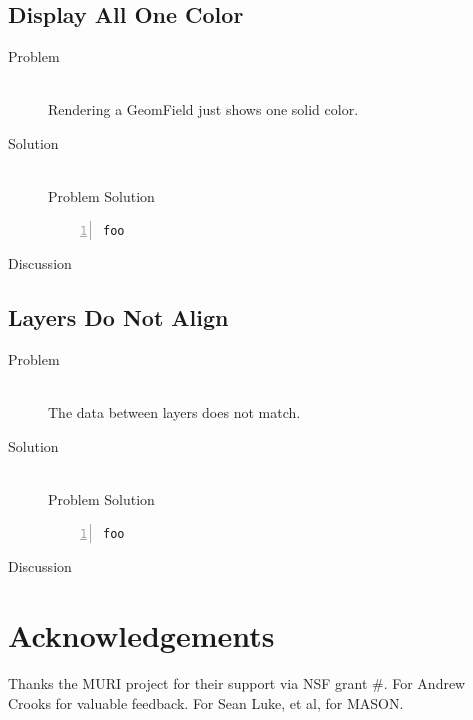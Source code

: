 \documentclass[twoside,10pt]{book}
\newcommand\code[1]{\textsf{#1}}
\begin{document}
\section{Display All One Color}
\label{sec:OneColorDisplay}

\begin{description}
\item[Problem]~\\
Rendering a \code{GeomField} just shows one solid color.

\item[Solution]~\\
Problem Solution
\begin{Verbatim}[frame=lines,framesep=5mm,numbers=left,commandchars=+\[\]]
foo
\end{Verbatim}

\item[Discussion ]
\end{description}


\section{Layers Do Not Align}
\label{sec:NonAlignedLayers}

\begin{description}
\item[Problem]~\\
The data between layers does not match.

\item[Solution]~\\
Problem Solution
\begin{Verbatim}[frame=lines,framesep=5mm,numbers=left,commandchars=+\[\]]
foo
\end{Verbatim}

\item[Discussion ]
\end{description}


\chapter{Acknowledgements}
\label{ch:ack}

Thanks the MURI project for their support via NSF grant \#.  For Andrew Crooks for
valuable feedback.  For Sean Luke, et al, for MASON.


\cleardoublepage
\footnotesize
{}
\printindex
\end{document}
